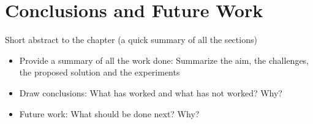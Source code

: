 \chapter{Conclusions and Future Work}
\label{ch:conclusions}

Short abstract to the chapter (a quick summary of all the sections)

\begin{itemize}
\item Provide a summary of all the work done: Summarize the aim, the challenges, the proposed solution and the experiments
\item Draw conclusions: What has worked and what has not worked? Why? 
\item Future work: What should be done next? Why?
\end{itemize}